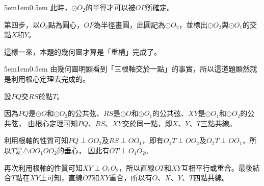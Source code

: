 \documentclass[12pt]{article}
\begin{document}
\begin{mybox}[畫法 1-1]{5em}{1em}{0.5em}
    此時，$\odot{O_2}$的半徑才可以被$OP$所確定。

    第四步，以$O_2$點為圓心，$OP$為半徑畫圓，此圓記為$\odot{O_2}$，並標出$\odot{O_2}$與$\odot{O_1}$的交點$X$和$Y$。
    \begin{figure}[H]
        \centering
    \end{figure}

    這樣一來，本題的幾何圖才算是「重構」完成了。
\end{mybox}
\begin{mybox}[解答 1-1]{5em}{1em}{0.5em}
    由幾何圖明顯看到「三根軸交於一點」的事實，所以這道題顯然就是利用根心定理去完成的。

    設$PQ$交$RS$於點$T$。
    
    因為$PQ$是$\odot{O}$和$\odot{O_2}$的公共弦、$RS$是$\odot{O}$和$\odot{O_1}$的公共弦、$XY$是$\odot{O_1}$和$\odot{O_2}$的公共弦，
    由根心定理可知$PQ$、$RS$、$XY$交於同一點，即$X$、$Y$、$T$三點共線。

    利用根軸的性質可知$PQ\perp OO_2$及$RS\perp OO_1$，即有$O_1T\perp OO_2$及$O_2T\perp OO_1$，所以$T$是$\triangle{OO_1OO_2}$的垂心，
    因此有$OT\perp O_1O_2$。

    再次利用根軸的性質可知$XY\perp O_1O_2$，所以直線$OT$和$XY$互相平行或重合。最後結合$T$點在$XY$上可知，直線$OT$和$XY$重合，所以有$O$、$X$、$Y$、$T$四點共線。
\end{mybox}
\end{document}
